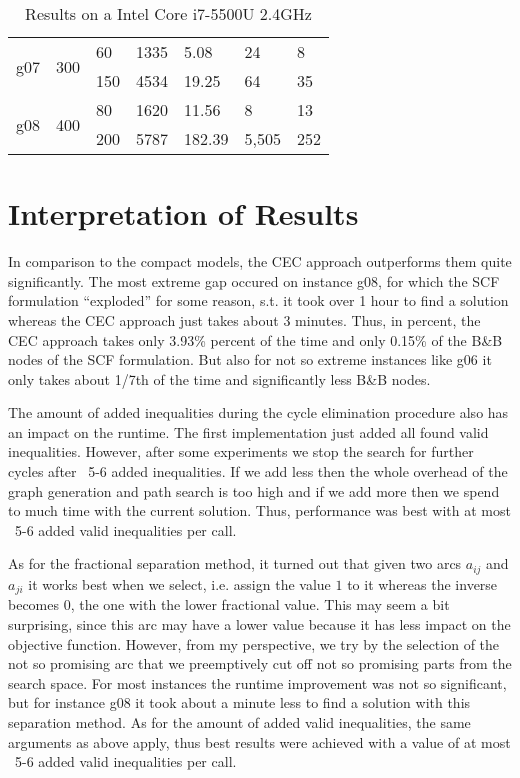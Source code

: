 \documentclass{article}
\begin{document}
\begin{table}[h!]
\begin{tabular}{l|l|l|l|l|l|l}
		\multirow{2}{*}{g07}& \multirow{2}{*}{300} 	& 60         	& 1335               & 5.08                       & 24         & 8                           \\
							&                   	& 150        	& 4534               & 19.25                      & 64         & 35                          \\ \hline
		\multirow{2}{*}{g08}& \multirow{2}{*}{400} 	& 80         	& 1620               & 11.56                      & 8        	& 13                           \\
							&                   	& 200        	& 5787               & 182.39                     & 5,505     & 252                            
	\end{tabular}
	\caption{Results on a Intel Core i7-5500U 2.4GHz}
\end{table}

\section{Interpretation of Results}

In comparison to the compact models, the CEC approach outperforms them quite significantly. The most extreme gap occured on instance g08, for which the SCF formulation ``exploded'' for some reason, s.t. it took over 1 hour to find a solution whereas the CEC approach just takes about 3 minutes. Thus, in percent, the CEC approach takes only 3.93\% percent of the time and only 0.15\% of the B\&B nodes of the SCF formulation. But also for not so extreme instances like g06 it only takes about 1/7th of the time and significantly less B\&B nodes.

The amount of added inequalities during the cycle elimination procedure also has an impact on the runtime. The first implementation just added all found valid inequalities. However, after some experiments we stop the search for further cycles after ~5-6 added inequalities. If we add less then the whole overhead of the graph generation and path search is too high and if we add more then we spend to much time with the current solution. Thus, performance was best with at most ~5-6 added valid inequalities per call.

As for the fractional separation method, it turned out that given two arcs $a_{i j}$ and $a_{j i}$ it works best when we select, i.e. assign the value $1$ to it whereas the inverse becomes $0$, the one with the lower fractional value. This may seem a bit surprising, since this arc may have a lower value because it has less impact on the objective function. However, from my perspective, we try by the selection of the not so promising arc that we preemptively cut off not so promising parts from the search space. For most instances the runtime improvement was not so significant, but for instance g08 it took about a minute less to find a solution with this separation method. As for the amount of added valid inequalities, the same arguments as above apply, thus best results were achieved with a value of at most ~5-6 added valid inequalities per call.
\end{document}
